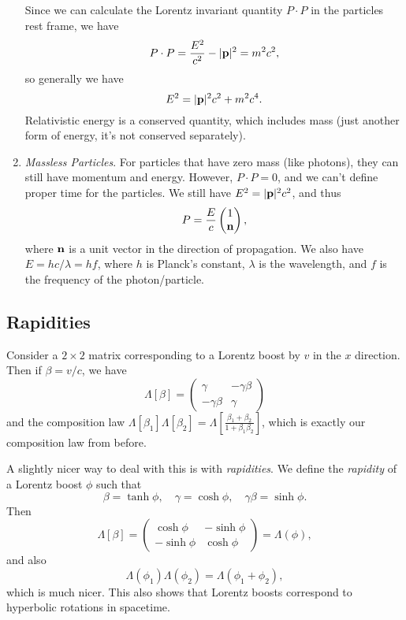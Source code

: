 \documentclass[a4paper]{scrartcl}
\begin{document}
\begin{enumerate}
Since we can calculate the Lorentz invariant quantity $P \cdot P$ in the particles rest frame, we have
$$
P \cdot P = \frac{E^2}{c^2} - |\mathbf{p}|^2 = m^2 c^2,
$$
so generally we have 
$$
E^2 = |\mathbf{p}|^2 c^2 + m^2 c^4.
$$
Relativistic energy is a conserved quantity, which includes mass (just another form of energy, it's not conserved separately).
\item \emph{Massless Particles}. For particles that have zero mass (like photons), they can still have momentum and energy. However, $P \cdot P = 0$, and we can't define proper time for the particles. We still have $E^2 = |\mathbf{p}|^2 c^2$, and thus
$$
P = \frac{E}{c} \begin{pmatrix}
	1 \\ \mathbf{n}
\end{pmatrix},
$$
where $\mathbf{n}$ is a unit vector in the direction of propagation. We also have $E = hc/\lambda = hf$, where $h$ is Planck's constant, $\lambda$ is the wavelength, and $f$ is the frequency of the photon/particle. 
\end{enumerate}

\subsection{Rapidities}

Consider a $2 \times 2$ matrix corresponding to a Lorentz boost by $v$ in the $x$ direction. Then if $\beta = v/c$, we have
$$
\Lambda[\beta] = \begin{pmatrix}
	\gamma & -\gamma \beta \\
	-\gamma \beta & \gamma
\end{pmatrix}
$$
and the composition law $\Lambda[\beta_1] \Lambda[\beta_2] = \Lambda\left[\frac{\beta_1 + \beta_2}{1 + \beta_1 \beta_2}\right]$,
which is exactly our composition law from before.

A slightly nicer way to deal with this is with \emph{rapidities}.
We define the \emph{rapidity} of a Lorentz boost $\phi$ such that
$$
\beta = \tanh \phi, \quad \gamma = \cosh \phi,\quad \gamma \beta = \sinh \phi.
$$
Then
$$
\Lambda[\beta] = \begin{pmatrix}
	\cosh \phi & - \sinh \phi \\
	-\sinh \phi & \cosh \phi 
\end{pmatrix} = \Lambda(\phi),
$$
and also
$$
\Lambda(\phi_1) \Lambda(\phi_2) = \Lambda(\phi_1 + \phi_2),
$$
which is much nicer. This also shows that Lorentz boosts correspond to hyperbolic rotations in spacetime.
\end{document}
